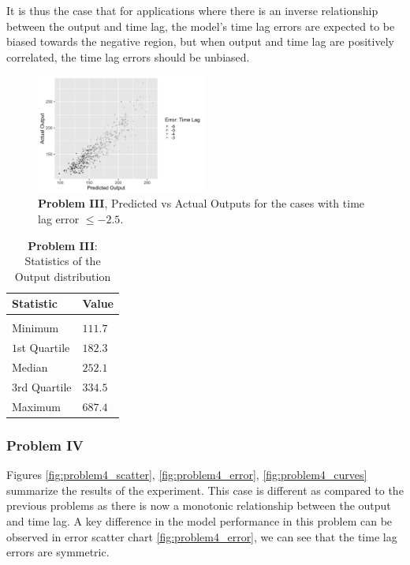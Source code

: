 \documentclass[twoside]{article}
\begin{document}
It is thus the case that for applications where there is an inverse relationship between the output and time lag, the model's time lag errors are expected to be biased towards the negative region, but when output and time lag are positively correlated, the time lag errors should be unbiased.

\begin{figure}[h]
\vspace{.3in}
\centerline{\includegraphics[width=0.5\textwidth]{figures/exp3_lag_error_jus.png}}
\vspace{.3in}
\caption{\textbf{Problem III}, Predicted vs Actual Outputs for the cases with time lag error $\leq -2.5$.}
\label{fig:problem3_lag_error_jus}
\end{figure}



\begin{table}[h]
\caption{\textbf{Problem III}: Statistics of the Output distribution} \label{table:problem3_stats}
\begin{center}
\begin{tabular}{ll}
\textbf{Statistic}  &\textbf{Value} \\
\hline \\
Minimum         & $111.7$ \\
$1$st Quartile  & $182.3$ \\
Median          & $252.1$ \\
$3$rd Quartile  & $334.5$ \\
Maximum         & $687.4$ \\
\end{tabular}
\end{center}
\end{table}


\subsubsection{Problem IV}

Figures \ref{fig:problem4_scatter}, \ref{fig:problem4_error}, \ref{fig:problem4_curves} summarize the results of the experiment. This case is different as compared to the previous problems as there is now
a monotonic relationship between the output and time lag. A key difference in the model performance in this problem can be observed in error scatter chart \ref{fig:problem4_error}, we can see that the time lag errors are symmetric.
\end{document}
